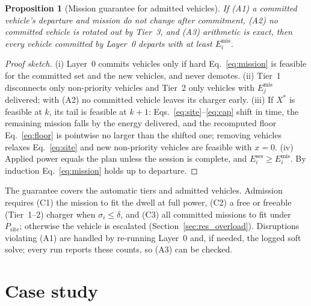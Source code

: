 \documentclass[preprint,12pt]{elsarticle}
\newtheorem{proposition}{Proposition}
\newcommand{\Ses}{E^{\mathrm{ses}}}
\newcommand{\Mis}{E^{\mathrm{mis}}}
\newcommand{\Psite}{P_{\mathrm{site}}}
\begin{document}
\begin{proposition}[Mission guarantee for admitted vehicles]
\label{prop:guarantee}
If (A1) a committed vehicle's departure and mission do not change after commitment, (A2) no committed vehicle
is rotated out by Tier~3, and (A3) arithmetic is exact, then every vehicle committed by Layer~0 departs with
at least $\Mis_i$.
\end{proposition}
\begin{proof}[Proof sketch]
(i) Layer~0 commits vehicles only if hard Eq.~\eqref{eq:mission} is feasible for the committed set and the new
vehicles, and never demotes. (ii) Tier~1 disconnects only non-priority vehicles and Tier~2 only vehicles with
$\Mis_j$ delivered; with (A2) no committed vehicle leaves its charger early. (iii) If $X^\ast$ is feasible at
$k$, its tail is feasible at $k+1$: Eqs.~\eqref{eq:site}--\eqref{eq:cap} shift in time, the remaining mission
falls by the energy delivered, and the recomputed floor Eq.~\eqref{eq:floor} is pointwise no larger than the
shifted one; removing vehicles relaxes Eq.~\eqref{eq:site} and new non-priority vehicles are feasible with
$x=0$. (iv) Applied power equals the plan unless the session is complete, and $\Ses_i\ge\Mis_i$. By induction
Eq.~\eqref{eq:mission} holds up to departure.
\end{proof}
The guarantee covers the automatic tiers and admitted vehicles. Admission requires (C1) the mission to fit the
dwell at full power, (C2) a free or freeable (Tier~1--2) charger when $\sigma_i\le\delta$, and (C3) all
committed missions to fit under $\Psite$; otherwise the vehicle is escalated (Section~\ref{sec:res_overload}).
Disruptions violating (A1) are handled by re-running Layer~0 and, if needed, the logged soft solve; every run
reports these counts, so (A3) can be checked.

\section{Case study}
\label{sec:setup}
\end{document}

